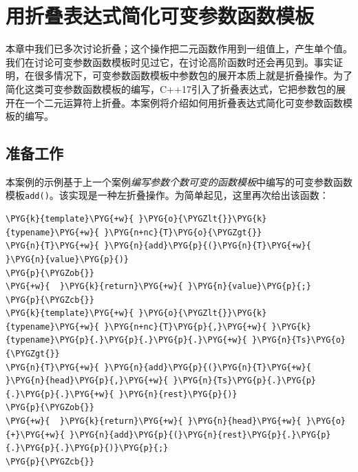 
\section{用折叠表达式简化可变参数函数模板}



本章中我们已多次讨论折叠；这个操作把二元函数作用到一组值上，产生单个值。我们在讨论可变参数函数模板时见过它，在讨论高阶函数时还会再见到。事实证明，在很多情况下，可变参数函数模板中参数包的展开本质上就是折叠操作。为了简化这类可变参数函数模板的编写，C++17引入了折叠表达式，它把参数包的展开在一个二元运算符上折叠。本案例将介绍如何用折叠表达式简化可变参数函数模板的编写。



\subsection{准备工作}



本案例的示例基于上一个案例\textit{编写参数个数可变的函数模板}中编写的可变参数函数模板\texttt{add()}。该实现是一种左折叠操作。为简单起见，这里再次给出该函数：



\begin{codeblockbg}
\begin{Verbatim}[commandchars=\\\{\},breaklines=true,breakanywhere=true,fontsize=\codefont,xleftmargin=17bp]
\PYG{k}{template}\PYG{+w}{ }\PYG{o}{\PYGZlt{}}\PYG{k}{typename}\PYG{+w}{ }\PYG{n+nc}{T}\PYG{o}{\PYGZgt{}}
\PYG{n}{T}\PYG{+w}{ }\PYG{n}{add}\PYG{p}{(}\PYG{n}{T}\PYG{+w}{ }\PYG{n}{value}\PYG{p}{)}
\PYG{p}{\PYGZob{}}
\PYG{+w}{  }\PYG{k}{return}\PYG{+w}{ }\PYG{n}{value}\PYG{p}{;}
\PYG{p}{\PYGZcb{}}
\PYG{k}{template}\PYG{+w}{ }\PYG{o}{\PYGZlt{}}\PYG{k}{typename}\PYG{+w}{ }\PYG{n+nc}{T}\PYG{p}{,}\PYG{+w}{ }\PYG{k}{typename}\PYG{p}{.}\PYG{p}{.}\PYG{p}{.}\PYG{+w}{ }\PYG{n}{Ts}\PYG{o}{\PYGZgt{}}
\PYG{n}{T}\PYG{+w}{ }\PYG{n}{add}\PYG{p}{(}\PYG{n}{T}\PYG{+w}{ }\PYG{n}{head}\PYG{p}{,}\PYG{+w}{ }\PYG{n}{Ts}\PYG{p}{.}\PYG{p}{.}\PYG{p}{.}\PYG{+w}{ }\PYG{n}{rest}\PYG{p}{)}
\PYG{p}{\PYGZob{}}
\PYG{+w}{  }\PYG{k}{return}\PYG{+w}{ }\PYG{n}{head}\PYG{+w}{ }\PYG{o}{+}\PYG{+w}{ }\PYG{n}{add}\PYG{p}{(}\PYG{n}{rest}\PYG{p}{.}\PYG{p}{.}\PYG{p}{.}\PYG{p}{)}\PYG{p}{;}
\PYG{p}{\PYGZcb{}}
\end{Verbatim}
\end{codeblockbg}


